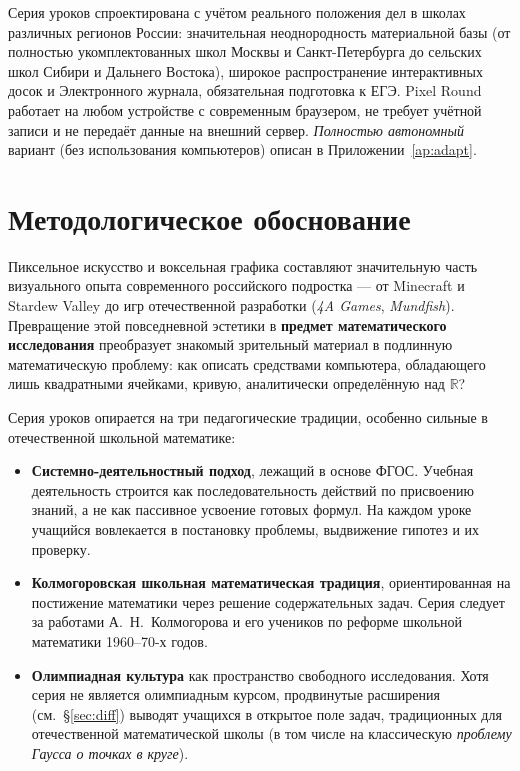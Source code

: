 \documentclass[12pt,a4paper]{scrartcl}
\newcommand{\acc}[1]{\textcolor{accent}{\textbf{#1}}}
\begin{document}
\begin{primechanie}
Серия уроков спроектирована с учётом реального положения дел в школах различных регионов России: значительная неоднородность материальной базы (от полностью укомплектованных школ Москвы и Санкт-Петербурга до сельских школ Сибири и Дальнего Востока), широкое распространение интерактивных досок и Электронного журнала, обязательная подготовка к ЕГЭ. Pixel Round работает на любом устройстве с современным браузером, не требует учётной записи и не передаёт данные на внешний сервер. \emph{Полностью автономный} вариант (без использования компьютеров) описан в Приложении~\ref{ap:adapt}.
\end{primechanie}

\section{Методологическое обоснование}

Пиксельное искусство и воксельная графика составляют значительную часть визуального опыта современного российского подростка --- от Minecraft и Stardew Valley до игр отечественной разработки (\emph{4A Games}, \emph{Mundfish}). Превращение этой повседневной эстетики в \acc{предмет математического исследования} преобразует знакомый зрительный материал в подлинную математическую проблему: как описать средствами компьютера, обладающего лишь квадратными ячейками, кривую, аналитически определённую над $\mathbb{R}$?

Серия уроков опирается на три педагогические традиции, особенно сильные в отечественной школьной математике:

\begin{itemize}[leftmargin=1.3em,itemsep=0.15em,topsep=0.3em]
  \item \acc{Системно-деятельностный подход}, лежащий в основе ФГОС. Учебная деятельность строится как последовательность действий по присвоению знаний, а не как пассивное усвоение готовых формул. На каждом уроке учащийся вовлекается в постановку проблемы, выдвижение гипотез и их проверку.
  \item \acc{Колмогоровская школьная математическая традиция}, ориентированная на постижение математики через решение содержательных задач. Серия следует за работами А.~Н.~Колмогорова и его учеников по реформе школьной математики 1960--70-х годов.
  \item \acc{Олимпиадная культура} как пространство свободного исследования. Хотя серия не является олимпиадным курсом, продвинутые расширения (см.~§\ref{sec:diff}) выводят учащихся в открытое поле задач, традиционных для отечественной математической школы (в том числе на классическую \emph{проблему Гаусса о точках в круге}).
\end{itemize}
\end{document}
